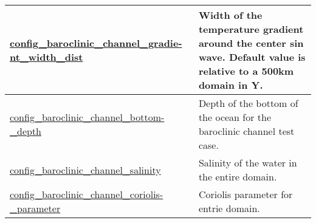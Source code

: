 {\begin{center}
\begin{longtable}{| p{2.0in} || p{4.0in} |}
    \hline
    \hyperref[subsec:nm_sec_config_baroclinic_channel_gradient_width_dist]{config\_baroclinic\_channel\_gradie-}\hyperref[subsec:nm_sec_config_baroclinic_channel_gradient_width_dist]{nt\_width\_dist}& Width of the temperature gradient around the center sin wave. Default value is relative to a 500km domain in Y. \\
    \hline
    \hyperref[subsec:nm_sec_config_baroclinic_channel_bottom_depth]{config\_baroclinic\_channel\_bottom-}\hyperref[subsec:nm_sec_config_baroclinic_channel_bottom_depth]{\_depth}& Depth of the bottom of the ocean for the baroclinic channel test case. \\
    \hline
    \hyperref[subsec:nm_sec_config_baroclinic_channel_salinity]{config\_baroclinic\_channel\_salinity} & Salinity of the water in the entire domain. \\
    \hline
    \hyperref[subsec:nm_sec_config_baroclinic_channel_coriolis_parameter]{config\_baroclinic\_channel\_coriolis-}\hyperref[subsec:nm_sec_config_baroclinic_channel_coriolis_parameter]{\_parameter}& Coriolis parameter for entrie domain. \\
    \hline
\end{longtable}
\end{center}
}
